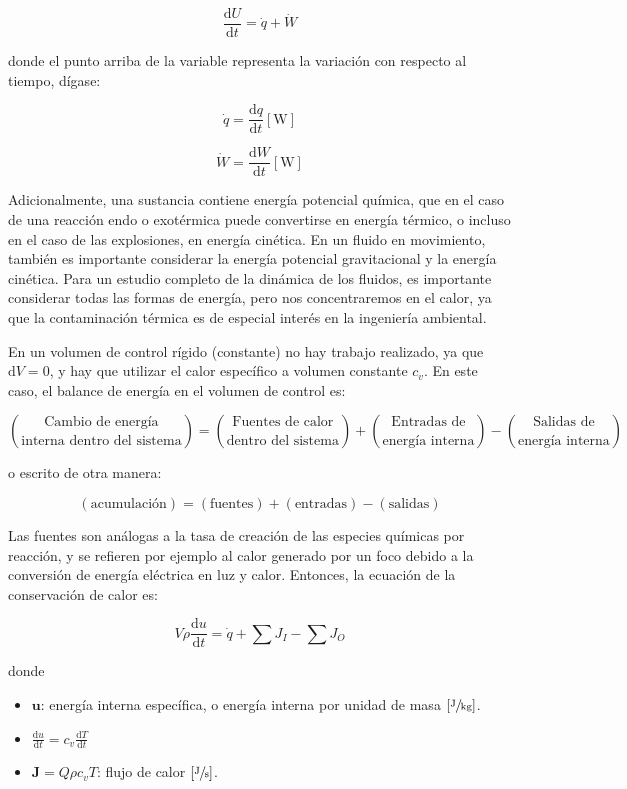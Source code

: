 \documentclass[11pt]{article}
\begin{document}
\[ \boxed{ \frac{\mathrm d U}{\mathrm d t} = \dot q + \dot W } \]

donde el punto arriba de la variable representa la variación con respecto al tiempo, dígase:

\[ \dot q  = \frac{\mathrm d q}{\mathrm d t} \left[ \text{W} \right] \]

\[ \dot W  = \frac{\mathrm d W}{\mathrm d t} \left[ \text{W} \right] \]

Adicionalmente, una sustancia contiene energía potencial química, que en el caso de una reacción endo o exotérmica puede convertirse en energía térmico, o incluso en el caso de las explosiones, en energía cinética. En un fluido en movimiento, también es importante considerar la energía potencial gravitacional y la energía cinética. Para un estudio completo de la dinámica de los fluidos, es importante considerar todas las formas de energía, pero nos concentraremos en el calor, ya que la contaminación térmica es de especial interés en la ingeniería ambiental.

En un volumen de control rígido (constante) no hay trabajo realizado, ya que \( \mathrm d V = 0 \), y hay que utilizar el calor específico a volumen constante \( c_v \). En este caso, el balance de energía en el volumen de control es:

\[ \binom{\text{Cambio de energía}}{\text{interna dentro del sistema}} = \binom{\text{Fuentes de calor}}{\text{dentro del sistema}} + \binom{\text{Entradas de}}{\text{energía interna}} - \binom{\text{Salidas de}}{\text{energía interna}} \]

o escrito de otra manera:

\[ \left( \text{acumulación} \right) = \left( \text{fuentes} \right) + \left( \text{entradas} \right) - \left( \text{salidas} \right) \]

Las fuentes son análogas a la tasa de creación de las especies químicas por reacción, y se refieren por ejemplo al calor generado por un foco debido a la conversión de energía eléctrica en luz y calor. Entonces, la ecuación de la conservación de calor es:

\[ \boxed{ V \rho \frac{\mathrm d u}{\mathrm d t} = \dot q  + \sum J_I - \sum J_O } \]

donde

\begin{itemize}
    \item \( \mathbf{ u } \): energía interna específica, o energía interna por unidad de masa \( \left[ \sfrac{\text{J}}{\text{kg}} \right] \).
    
    \item \( \frac{\mathrm d u }{\mathrm d t} = c_v \frac{\mathrm d T}{\mathrm d t} \)
    
    \item \( \mathbf{J} = Q \rho c_v T \): flujo de calor \( \left[ \sfrac{\text{J}}{\text{s}} \right] \).
\end{itemize}
\end{document}
